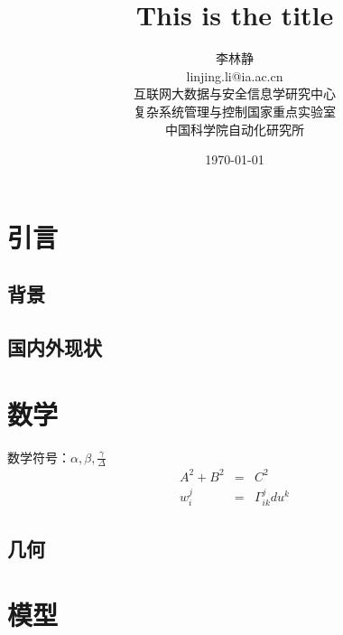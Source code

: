 \documentclass[a4paper,12pt]{article}
\begin{document}
\title{This is the title}
\author{
	李林静\\
	linjing.li@ia.ac.cn\\
	互联网大数据与安全信息学研究中心\\
	复杂系统管理与控制国家重点实验室\\
	中国科学院自动化研究所
	}
\date{\today}

\maketitle

\section{引言}

\subsection{背景}

\subsection{国内外现状}


\section{数学}

数学符号：$\alpha,\beta,\frac{\gamma}{\Delta}$
\begin{eqnarray}
	A^2 + B^2 &=& C^2 \\
	w_i^j &=& \Gamma_{ik}^jdu^k
\end{eqnarray}

\subsection{几何}

\section{模型}
\end{document}
